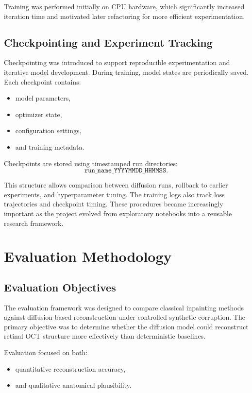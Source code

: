 \documentclass[12pt,oneside]{article}
\begin{document}
Training was performed initially on CPU hardware, which significantly increased iteration time and motivated later refactoring for more efficient experimentation.

\subsection*{Checkpointing and Experiment Tracking}

Checkpointing was introduced to support reproducible experimentation and iterative model development.
During training, model states are periodically saved.
Each checkpoint contains:
\begin{itemize}
    \item model parameters,
    \item optimizer state,
    \item configuration settings,
    \item and training metadata.
\end{itemize}

Checkpoints are stored using timestamped run directories:
\[
\texttt{run\_name\_YYYYMMDD\_HHMMSS}.
\]

This structure allows comparison between diffusion runs, rollback to earlier experiments, and hyperparameter tuning. The training logs also track loss trajectories and checkpoint timing.
These procedures became increasingly important as the project evolved from exploratory notebooks into a reusable research framework.

\section{Evaluation Methodology}

\subsection*{Evaluation Objectives}

The evaluation framework was designed to compare classical inpainting methods against diffusion-based reconstruction under controlled synthetic corruption. The primary objective was to determine whether the diffusion model could reconstruct retinal OCT structure more effectively than deterministic baselines.

Evaluation focused on both:
\begin{itemize}
    \item quantitative reconstruction accuracy,
    \item and qualitative anatomical plausibility.
\end{itemize}
\end{document}
